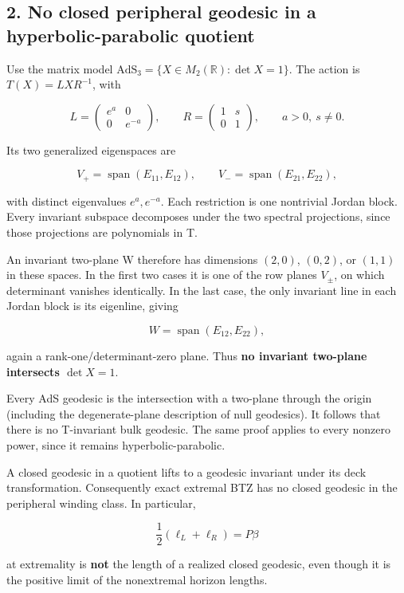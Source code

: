 \documentclass[11pt]{article}
\begin{document}
\subsection{2. No closed peripheral geodesic in a hyperbolic-parabolic
quotient}\label{no-closed-peripheral-geodesic-in-a-hyperbolic-parabolic-quotient}

Use the matrix model
\(\mathrm{AdS}_3=\{X\in M_2(\mathbb R):\det X=1\}\). The action is
\(T(X)=LXR^{-1}\), with

\[
L=\begin{pmatrix}e^a&0\\0&e^{-a}\end{pmatrix},\qquad
R=\begin{pmatrix}1&s\\0&1\end{pmatrix},\qquad a>0,\ s\ne0.
\]

Its two generalized eigenspaces are

\[
V_+=\operatorname{span}(E_{11},E_{12}),\qquad
V_-=\operatorname{span}(E_{21},E_{22}),
\]

with distinct eigenvalues \(e^a,e^{-a}\). Each restriction is one
nontrivial Jordan block. Every invariant subspace decomposes under the
two spectral projections, since those projections are polynomials in T.

An invariant two-plane W therefore has dimensions \((2,0)\), \((0,2)\),
or \((1,1)\) in these spaces. In the first two cases it is one of the
row planes \(V_\pm\), on which determinant vanishes identically. In the
last case, the only invariant line in each Jordan block is its
eigenline, giving

\[
W=\operatorname{span}(E_{12},E_{22}),
\]

again a rank-one/determinant-zero plane. Thus \textbf{no invariant
two-plane intersects \(\det X=1\)}.

Every AdS geodesic is the intersection with a two-plane through the
origin (including the degenerate-plane description of null geodesics).
It follows that there is no T-invariant bulk geodesic. The same proof
applies to every nonzero power, since it remains hyperbolic-parabolic.

A closed geodesic in a quotient lifts to a geodesic invariant under its
deck transformation. Consequently exact extremal BTZ has no closed
geodesic in the peripheral winding class. In particular,

\[
\frac12(\ell_L+\ell_R)=P\beta
\]

at extremality is \textbf{not} the length of a realized closed geodesic,
even though it is the positive limit of the nonextremal horizon lengths.
\end{document}
